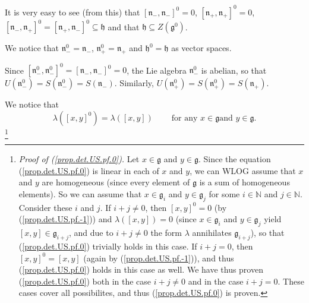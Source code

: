 \documentclass
[numbers=enddot,12pt,final,onecolumn,german,notitlepage]{scrartcl}%
\theoremstyle{definition}
\begin{document}
It is very easy to see (from this) that $\left[  \mathfrak{n}_{-}%
,\mathfrak{n}_{-}\right]  ^{0}=0$, $\left[  \mathfrak{n}_{+},\mathfrak{n}%
_{+}\right]  ^{0}=0$, $\left[  \mathfrak{n}_{-},\mathfrak{n}_{+}\right]
^{0}=\left[  \mathfrak{n}_{+},\mathfrak{n}_{-}\right]  ^{0}\subseteq
\mathfrak{h}$ and that $\mathfrak{h}\subseteq Z\left(  \mathfrak{g}%
^{0}\right)  $.

We notice that $\mathfrak{n}_{-}^{0}=\mathfrak{n}_{-}$, $\mathfrak{n}_{+}%
^{0}=\mathfrak{n}_{+}$ and $\mathfrak{h}^{0}=\mathfrak{h}$ as vector spaces.

Since $\left[  \mathfrak{n}_{-}^{0},\mathfrak{n}_{-}^{0}\right]  ^{0}=\left[
\mathfrak{n}_{-},\mathfrak{n}_{-}\right]  ^{0}=0$, the Lie algebra
$\mathfrak{n}_{-}^{0}$ is abelian, so that $U\left(  \mathfrak{n}_{-}%
^{0}\right)  =S\left(  \mathfrak{n}_{-}^{0}\right)  =S\left(  \mathfrak{n}%
_{-}\right)  $. Similarly, $U\left(  \mathfrak{n}_{+}^{0}\right)  =S\left(
\mathfrak{n}_{+}^{0}\right)  =S\left(  \mathfrak{n}_{+}\right)  $.

We notice that%
\begin{equation}
\lambda\left(  \left[  x,y\right]  ^{0}\right)  =\lambda\left(  \left[
x,y\right]  \right)  \ \ \ \ \ \ \ \ \ \ \text{for any }x\in\mathfrak{g}\text{
and }y\in\mathfrak{g}. \label{prop.det.US.pf.0}%
\end{equation}
\footnote{\textit{Proof of (\ref{prop.det.US.pf.0}).} Let $x\in\mathfrak{g}$
and $y\in\mathfrak{g}$. Since the equation (\ref{prop.det.US.pf.0}) is linear
in each of $x$ and $y$, we can WLOG assume that $x$ and $y$ are homogeneous
(since every element of $\mathfrak{g}$ is a sum of homogeneous elements). So
we can assume that $x\in\mathfrak{g}_{i}$ and $y\in\mathfrak{g}_{j}$ for some
$i\in\mathbb{N}$ and $j\in\mathbb{N}$. Consider these $i$ and $j$. If
$i+j\neq0$, then $\left[  x,y\right]  ^{0}=0$ (by (\ref{prop.det.US.pf.-1}))
and $\lambda\left(  \left[  x,y\right]  \right)  =0$ (since $x\in
\mathfrak{g}_{i}$ and $y\in\mathfrak{g}_{j}$ yield $\left[  x,y\right]
\in\mathfrak{g}_{i+j}$, and due to $i+j\neq0$ the form $\lambda$ annihilates
$\mathfrak{g}_{i+j}$), so that (\ref{prop.det.US.pf.0}) trivially holds in
this case. If $i+j=0$, then $\left[  x,y\right]  ^{0}=\left[  x,y\right]  $
(again by (\ref{prop.det.US.pf.-1})), and thus (\ref{prop.det.US.pf.0}) holds
in this case as well. We have thus proven (\ref{prop.det.US.pf.0}) both in the
case $i+j\neq0$ and in the case $i+j=0$. These cases cover all possibilites,
and thus (\ref{prop.det.US.pf.0}) is proven.}
\end{document}
